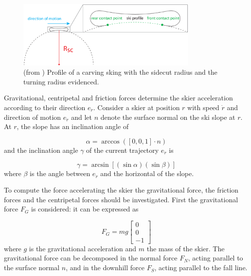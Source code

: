 \documentclass[12pt,a4paper,twoside]{book}
\begin{document}
\begin{figure}[!ht]
  \begin{center}
    \includegraphics[width=0.8\textwidth]{images/sidecut_radius.eps}
    \caption{(from \cite{hol2012}) Profile of a carving sking with the sidecut radius and the turning radius evidenced.}\label{sidecut_radius}
  \end{center}
\end{figure}

Gravitational, centripetal and friction forces determine the skier acceleration according to their direction $e_{\dot{r}}$. Consider a skier at position $r$ with speed $\dot{r}$ and direction of motion $e_{\dot{r}}$ and let $n$ denote the surface normal on the ski slope at $r$. At $r$, the slope has an inclination angle of

\begin{equation}
\alpha =\arccos(\left[0,0,1\right] \cdot n)
\end{equation}
and the inclination angle $\gamma$ of the current trajectory $e_{\dot{r}}$ is

\begin{equation}
\gamma =\arcsin[(\sin \alpha )(\sin \beta )]
\end{equation}
where $\beta$ is the angle between $e_{\dot{r}}$ and the horizontal of the slope.

To compute the force accelerating the skier the gravitational force, the friction forces and the centripetal forces should be investigated. First the gravitational force $F_G$ is considered: it can be expressed as

\begin{equation}
F_G=mg\left[\begin{matrix}0\\0\\-1\end{matrix}\right]
\end{equation}
where $g$ is the gravitational acceleration and $m$ the mass of the skier. The gravitational force can be decomposed in the normal force $F_N$, acting parallel to the surface normal $n$, and in the downhill force $F_S$, acting parallel to the fall line.
\end{document}
